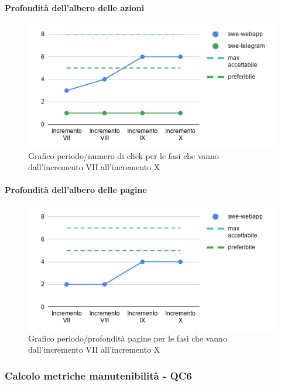 \paragraph{Profondità dell'albero delle azioni}
\begin{figure}[H]
			\centering
			\includegraphics[width=0.8\linewidth]{./res/images/QM-PROD-9-PAA.png}
			\caption{Grafico periodo/numero di click per le fasi che vanno dall'incremento VII all'incremento X}
			\label{fig:Grafico periodo/numero di click per le fasi che vanno dall'incremento VII all'incremento X}
	\end{figure}
\paragraph{Profondità dell'albero delle pagine}
\begin{figure}[H]
			\centering
			\includegraphics[width=0.8\linewidth]{./res/images/QM-PROD-10-PAP.png}
			\caption{Grafico periodo/profondità pagine per le fasi che vanno dall'incremento VII all'incremento X}
			\label{fig:Grafico periodo/profondità pagine per le fasi che vanno dall'incremento VII all'incremento X}
	\end{figure}

\subsubsection{Calcolo metriche manutenibilità - QC6}
